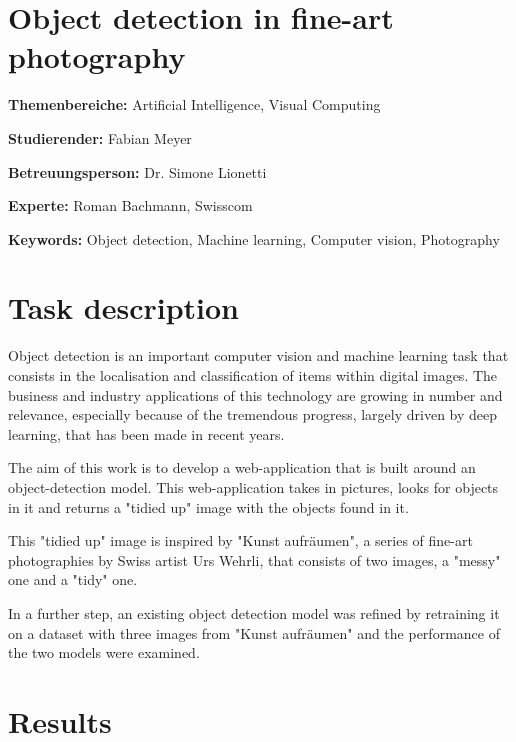 \documentclass[a4paper,10pt,hidelinks]{scrartcl}
\begin{document}
\section*{\fontsize{18}{20}\selectfont Object detection in fine-art photography}
\thispagestyle{firstpage}

\textbf{Themenbereiche:} \tabto{4cm} Artificial Intelligence, Visual Computing

\noindent
\textbf{Studierender:} \tabto{4cm} Fabian Meyer

\noindent
\textbf{Betreuungsperson:} \tabto{4cm} Dr. Simone Lionetti

\noindent
\textbf{Experte:} \tabto{4cm} Roman Bachmann, Swisscom

\noindent
\textbf{Keywords:} \tabto{4cm} Object detection, Machine learning, Computer vision, Photography

\section{\fontsize{14}{16}\selectfont Task description}

Object detection is an important computer vision and machine learning task that consists in the localisation and classification of items within digital images. The business and industry applications of this technology are growing in number and relevance, especially because of the tremendous progress, largely driven by deep learning, that has been made in recent years.

The aim of this work is to develop a web-application that is built around an object-detection model. This web-application takes in pictures, looks for objects in it and returns a "tidied up" image with the objects found in it. 

This "tidied up" image is inspired by "Kunst aufräumen", a series of fine-art photographies by Swiss artist Urs Wehrli, that consists of two images, a "messy" one and a "tidy" one.

In a further step, an existing object detection model was refined by retraining it on a dataset with three images from "Kunst aufräumen" and the performance of the two models were examined.

\section{\fontsize{14}{16}\selectfont Results}
\end{document}
